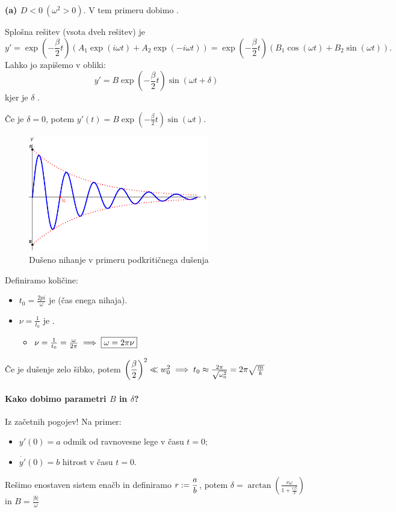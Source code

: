 \textbf{(a) \(D < 0 \ (\omega^2 > 0)\)}. V tem primeru dobimo .

Splošna rešitev (vsota dveh rešitev) je 
\[
    y' = \exp\left(-\frac{\beta}{2}t\right) (A_1 \exp(i\omega t) + A_2 \exp(-i\omega t)) = \exp\left(-\frac{\beta}{2}t\right)(B_1 \cos(\omega t) + B_2 \sin(\omega t)).
\]
Lahko jo zapišemo v obliki:
\[
    \boxed{y' = B \exp\left(-\frac{\beta}{2}t\right) \sin (\omega t + \delta)}
\]
kjer je \(\delta\) .

\begin{primer}
    Če je \(\delta = 0\), potem \(y'(t) = B \exp (-\frac{\beta}{2} t) \sin (\omega t)\).
    \begin{figure}[h!]
        \centering
        \includegraphics[width=0.7\textwidth]{img/01_002.pdf}
        \caption{Dušeno nihanje v primeru podkritičnega dušenja}      
    \end{figure}
    
    Definiramo količine:
    \begin{itemize}
        \item \(t_0 = \frac{2pi}{\omega}\) je  (čas enega nihaja).
        \item \(\nu = \frac{1}{t_0}\) je .
        \begin{itemize}
            \item \(\nu = \frac{1}{t_0} = \frac{\omega}{2 \pi} \implies \boxed{\omega = 2 \pi \nu}\)
        \end{itemize}
    \end{itemize}

    Če je dušenje zelo šibko, potem \(\left(\displaystyle \frac{\beta}{2}\right)^2 \ll w_0^2 \implies t_0 \approx \frac{2 \pi}{\sqrt{\omega_0^2}} = 2 \pi \sqrt{\frac{m}{k}}\)
\end{primer}

\paragraph{Kako dobimo parametri \(B\) in \(\delta\)?} Iz začetnih pogojev! Na primer:
\begin{itemize}
    \item \(y'(0) = a\) odmik od ravnovesne lege v času \(t = 0\);
    \item \(\dot{y'}(0) = b\) hitrost v času \(t = 0\).
\end{itemize}
Rešimo enostaven sistem enačb in definiramo \(\displaystyle r:= \frac{a}{b}\), potem \(\boxed{\delta = \arctan \left(\frac{r \omega}{1+\frac{r\beta}{2}}\right)}\) in \(\boxed{B = \frac{|b|}{\omega}}\)

